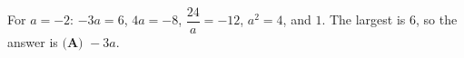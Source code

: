 For $a=-2$: $-3a=6$, $4a=-8$, $\dfrac{24}{a}=-12$, $a^2=4$, and $1$. The largest is $6$, so the answer is $\boxed{\textbf{(A) }-3a}$.

